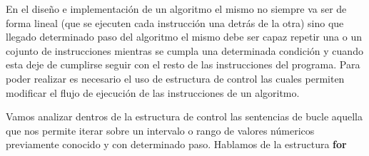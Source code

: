 En el diseño e implementación de un algoritmo el mismo no siempre va ser de forma lineal (que se ejecuten cada instrucción una detrás de la otra) sino que llegado determinado paso del algoritmo el mismo debe ser capaz repetir una o un cojunto de instrucciones mientras se cumpla una determinada condición y cuando esta deje de cumplirse seguir con el resto de las instrucciones del programa. Para poder realizar es necesario el uso de estructura de control las cuales permiten modificar el flujo de ejecución de las instrucciones de un algoritmo.

Vamos analizar dentros de la estructura de control las sentencias de bucle aquella que nos permite iterar sobre un intervalo o rango de valores númericos previamente conocido y con determinado paso. Hablamos de la estructura \textbf{for}